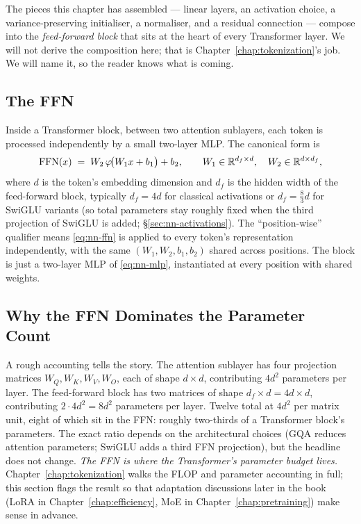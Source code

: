 The pieces this chapter has assembled --- linear layers, an
activation choice, a variance-preserving initialiser, a
normaliser, and a residual connection --- compose into the
\emph{feed-forward block} that sits at the heart of every
Transformer layer. We will not derive the composition here;
that is Chapter~\ref{chap:tokenization}'s job. We will name it, so the reader knows
what is coming.

\subsection{The FFN}

Inside a Transformer block, between two attention sublayers, each
token is processed independently by a small two-layer MLP. The
canonical form is
\begin{equation}
  \mathrm{FFN}(x) \;=\; W_2 \, \varphi\!\bigl(W_1 x + b_1\bigr) + b_2,
  \qquad
  W_1 \in \mathbb{R}^{d_f \times d},
  \quad
  W_2 \in \mathbb{R}^{d \times d_f},
  \label{eq:nn-ffn}
\end{equation}
where $d$ is the token's embedding dimension and $d_f$ is the
hidden width of the feed-forward block, typically $d_f = 4d$ for
classical activations or $d_f = \tfrac{8}{3} d$ for SwiGLU
variants (so total parameters stay roughly fixed when the third
projection of SwiGLU is added; \S\ref{sec:nn-activations}). The
``position-wise'' qualifier means \eqref{eq:nn-ffn} is applied to
every token's representation independently, with the same
$(W_1, W_2, b_1, b_2)$ shared across positions. The block is
just a two-layer MLP of \eqref{eq:nn-mlp}, instantiated at every
position with shared weights.

\subsection{Why the FFN Dominates the Parameter Count}

A rough accounting tells the story. The attention sublayer has
four projection matrices $W_Q, W_K, W_V, W_O$, each of shape
$d \times d$, contributing $4 d^2$ parameters per layer. The
feed-forward block has two matrices of shape $d_f \times d = 4d
\times d$, contributing $2 \cdot 4 d^2 = 8 d^2$ parameters per
layer. Twelve total at $4d^2$ per matrix unit, eight of which
sit in the FFN: roughly two-thirds of a Transformer block's
parameters. The exact ratio depends on the architectural choices
(GQA reduces attention parameters; SwiGLU adds a third FFN
projection), but the headline does not change. \emph{The FFN is
where the Transformer's parameter budget lives.} Chapter~\ref{chap:tokenization} walks
the FLOP and parameter accounting in full; this section flags the
result so that adaptation discussions later in the book (LoRA in
Chapter~\ref{chap:efficiency}, MoE in Chapter~\ref{chap:pretraining}) make sense in advance.

